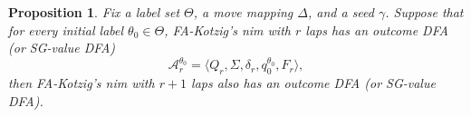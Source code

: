 \documentclass[11pt]{article}
\newtheorem{proposition}{Proposition}[section]
\theoremstyle{definition}
\theoremstyle{plain}
\newcommand{\x}{\mathbf{x}}
\newcommand{\e}{\mathbf{o}}
\begin{document}
%
%
%

\begin{proposition}\label{cyc_reduce}
Fix a label set $\Theta$, a move mapping $\Delta$, and a seed $\gamma$.
Suppose that for every initial label $\theta_0 \in \Theta$, FA-Kotzig's nim with $r$ laps has an outcome DFA (or SG-value DFA)
\[
\mathcal{A}_r^{\theta_0} = \langle Q_r, \Sigma, \delta_r, q_0^{\theta_0}, F_r \rangle,
\]
then FA-Kotzig's nim with $r+1$ laps also has an outcome DFA (or SG-value DFA).
\end{proposition}
\end{document}
